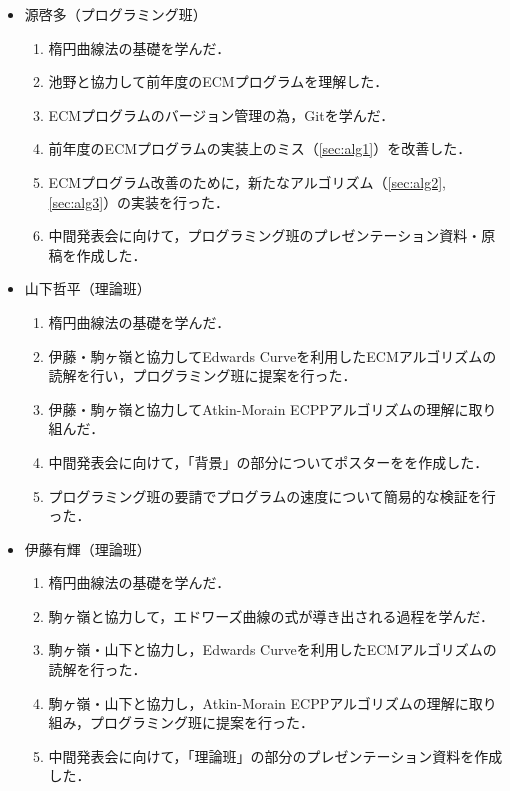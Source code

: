 \documentclass[openany,11pt,papersize]{jsbook}
\begin{document}
{\begin{itemize}
\item 源啓多（プログラミング班）
 \begin{enumerate}
 \renewcommand{\labelenumi}{(\arabic{enumi})}
 \item 楕円曲線法の基礎を学んだ．
 \item 池野と協力して前年度のECMプログラムを理解した．
 \item ECMプログラムのバージョン管理の為，Gitを学んだ．
 \item 前年度のECMプログラムの実装上のミス（\ref{sec:alg1}）を改善した．
 \item ECMプログラム改善のために，新たなアルゴリズム（\ref{sec:alg2}, \ref{sec:alg3}）の実装を行った．
 \item 中間発表会に向けて，プログラミング班のプレゼンテーション資料・原稿を作成した．
 \end{enumerate}
 
\item 山下哲平（理論班）
 \begin{enumerate}
 \renewcommand{\labelenumi}{(\arabic{enumi})}
 \item 楕円曲線法の基礎を学んだ．
 \item 伊藤・駒ヶ嶺と協力してEdwards Curveを利用したECMアルゴリズムの読解を行い，プログラミング班に提案を行った．
 \item 伊藤・駒ヶ嶺と協力してAtkin-Morain ECPPアルゴリズムの理解に取り組んだ．
 \item 中間発表会に向けて，「背景」の部分についてポスターをを作成した．
 \item プログラミング班の要請でプログラムの速度について簡易的な検証を行った．
 \end{enumerate}
 
\item 伊藤有輝（理論班）
 \begin{enumerate}
 \renewcommand{\labelenumi}{(\arabic{enumi})}
 \item 楕円曲線法の基礎を学んだ．
 \item 駒ヶ嶺と協力して，エドワーズ曲線の式が導き出される過程を学んだ．
 \item 駒ヶ嶺・山下と協力し，Edwards Curveを利用したECMアルゴリズムの読解を行った．
 \item 駒ヶ嶺・山下と協力し，Atkin-Morain ECPPアルゴリズムの理解に取り組み，プログラミング班に提案を行った．
 \item 中間発表会に向けて，「理論班」の部分のプレゼンテーション資料を作成した．
 \end{enumerate}
 

\end{itemize}}
\end{document}
